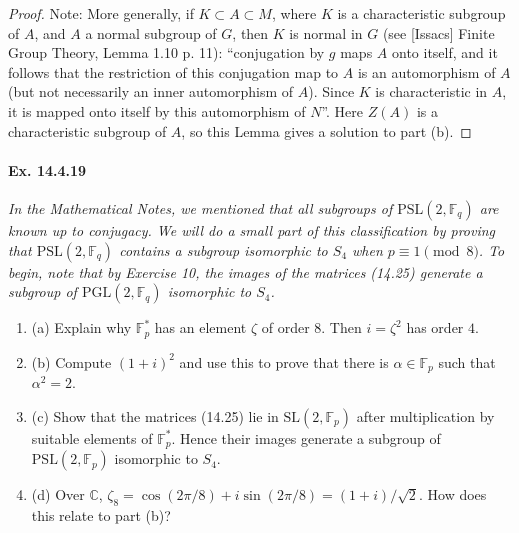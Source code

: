 \documentclass[11pt,a4paper]{article}
\newcommand{\be} {\begin{enumerate}}
\newcommand{\ee} {\end{enumerate}}
\newcommand{\C}{\mathbb{C}}
\newcommand{\F}{\mathbb{F}}
\begin{document}
{\begin{proof}
\bigskip

Note: More generally, if $K \subset A \subset M$, where $K$ is a characteristic subgroup of $A$, and $A$ a normal subgroup of $G$, then $K$ is normal in $G$ (see [Issacs] Finite Group Theory, Lemma 1.10 p. 11): ``conjugation by $g$ maps $A$ onto itself, and it follows that the restriction of this conjugation map to $A$ is an automorphism of $A$ (but not necessarily an inner automorphism of $A$). Since $K$ is characteristic in $A$, it is mapped onto itself by this automorphism of $N$''. Here $Z(A)$ is a characteristic subgroup of $A$, so this Lemma gives a solution to part (b).
\end{proof}

\paragraph{Ex. 14.4.19}{\it In the Mathematical Notes, we mentioned that all subgroups of $\mathrm{PSL}(2,\F_q)$ are known up to conjugacy. We will do a small part of this classification by proving that $\mathrm{PSL}(2,\F_q)$ contains a subgroup isomorphic to $S_4$ when $p\equiv 1 \pmod 8$. To begin, note that by Exercise 10, the images of the matrices (14.25) generate a subgroup of $\mathrm{PGL}(2,\F_q)$ isomorphic to $S_4$.
\be
\item[(a)] Explain why $\F_p^*$ has an element $\zeta$ of order $8$. Then $i = \zeta^2$ has order $4$.
\item[(b)] Compute $(1+i)^2$ and use this to prove that there is $\alpha \in \F_p$ such that $\alpha^2 = 2$.
\item[(c)] Show that the matrices (14.25) lie in $\mathrm{SL}(2,\F_p)$ after multiplication by suitable elements of $\F_p^*$. Hence their images generate a subgroup of $\mathrm{PSL}(2,\F_p)$ isomorphic to $S_4$.
\item[(d)] Over $\C$, $\zeta_8 = \cos(2\pi/8) + i \sin(2\pi/8) = (1+i)/\sqrt{2}$. How does this relate to part (b)?
\ee

}}
\end{document}
